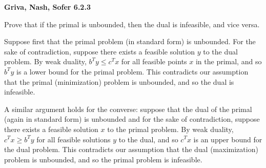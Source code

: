 \textbf{Griva, Nash, Sofer 6.2.3}

Prove that if the primal is unbounded, then the dual is infeasible, and vice versa.

\begin{solution}
  Suppose first that the primal problem (in standard form) is unbounded. For the sake of contradiction, suppose there
  exists a feasible solution $y$ to the dual problem. By weak duality, $b^T y \le c^T x$ for all feasible points $x$ in 
  the primal, and so $b^T y$ is a lower bound for the primal problem. This contradicts our assumption that the primal 
  (minimization) problem is unbounded, and so the dual is infeasible.

  A similar argument holds for the converse: suppose that the dual of the primal (again in standard form) is unbounded 
  and for the sake of contradiction, suppose there exists a feasible solution $x$ to the primal problem. By weak 
  duality, $c^T x \ge b^T y$ for all feasible solutions $y$ to the dual, and so $c^T x$ is an upper bound for the dual 
  problem.  This contradicts our assumption that the dual (maximization) problem is unbounded, and so the primal problem 
  is infeasible.
  \ \\
\end{solution}
